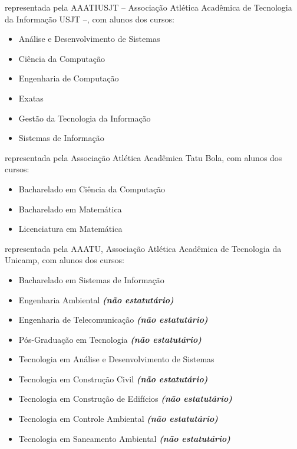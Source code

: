 \begin{article}
\begin{description}[noitemsep]
		\item[Universidade São Judas Tadeu] representada pela AAATIUSJT -- Associação Atlética Acadêmica de Tecnologia da Informação USJT --, com alunos dos cursos:
		\begin{itemize}[noitemsep]
			\item Análise e Desenvolvimento de Sistemas
			\item Ciência da Computação
			\item Engenharia de Computação
			\item Exatas
			\item Gestão da Tecnologia da Informação
			\item Sistemas de Informação
		\end{itemize}

		\item[UNESP - Rio Claro] representada pela Associação Atlética Acadêmica Tatu Bola, com alunos dos cursos:
		\begin{itemize}[noitemsep]
			\item Bacharelado em Ciência da Computação
			\item Bacharelado em Matemática
			\item Licenciatura em Matemática
		\end{itemize}

		\item[UNICAMP - Limeira] representada pela AAATU, Associação Atlética Acadêmica de Tecnologia da Unicamp, com alunos dos cursos:
		\begin{itemize}[noitemsep]
			\item Bacharelado em Sistemas de Informação
			\item Engenharia Ambiental \textbf{\textit{(não estatutário)}}
			\item Engenharia de Telecomunicação \textbf{\textit{(não estatutário)}}
			\item Pós-Graduação em Tecnologia \textbf{\textit{(não estatutário)}}
			\item Tecnologia em Análise e Desenvolvimento de Sistemas
			\item Tecnologia em Construção Civil \textbf{\textit{(não estatutário)}}
			\item Tecnologia em Construção de Edifícios \textbf{\textit{(não estatutário)}}
			\item Tecnologia em Controle Ambiental \textbf{\textit{(não estatutário)}}
			\item Tecnologia em Saneamento Ambiental \textbf{\textit{(não estatutário)}}
		\end{itemize}


\end{description}
\end{article}
